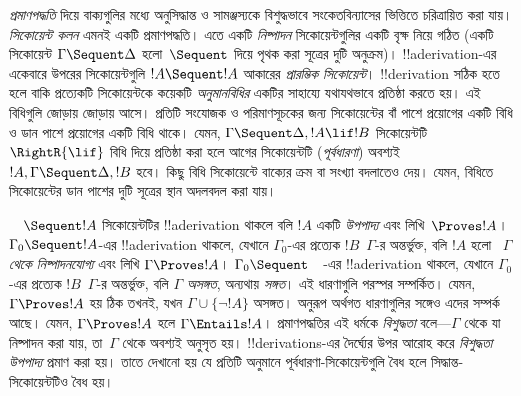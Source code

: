\emph{প্রমাণপদ্ধতি} দিয়ে বাক্যগুলির মধ্যে অনুসিদ্ধান্ত ও
সামঞ্জস্যকে বিশুদ্ধভাবে সংকেতবিন্যাসের ভিত্তিতে চরিত্রায়িত করা
যায়। \emph{সিকোয়েন্ট কলন} এমনই একটি প্রমাণপদ্ধতি। এতে একটি
\emph{নিষ্পাদন} সিকোয়েন্টগুলির একটি বৃক্ষ নিয়ে গঠিত (একটি
সিকোয়েন্ট $\Gamma \Sequent \Delta$ হলো~$\Sequent$ দিয়ে পৃথক
করা সূত্রের দুটি অনুক্রম)। !!a{derivation}-এর একেবারে উপরের
সিকোয়েন্টগুলি $!A \Sequent !A$ আকারের \emph{প্রারম্ভিক সিকোয়েন্ট}।
!!{derivation} সঠিক হতে হলে বাকি প্রত্যেকটি সিকোয়েন্টকে কয়েকটি
\emph{অনুমানবিধির} একটির সাহায্যে যথাযথভাবে প্রতিষ্ঠা করতে হয়।
এই বিধিগুলি জোড়ায় জোড়ায় আসে। প্রতিটি সংযোজক ও পরিমাণসূচকের
জন্য সিকোয়েন্টের বাঁ পাশে প্রয়োগের একটি বিধি ও ডান পাশে
প্রয়োগের একটি বিধি থাকে। যেমন, $\Gamma \Sequent \Delta, !A \lif !B$
সিকোয়েন্টটি $\RightR{\lif}$ বিধি দিয়ে প্রতিষ্ঠা করা হলে
আগের সিকোয়েন্টটি (\emph{পূর্বধারণা}) অবশ্যই
$!A, \Gamma \Sequent \Delta, !B$ হবে। কিছু বিধি সিকোয়েন্টে
বাক্যের ক্রম বা সংখ্যা বদলাতেও দেয়। যেমন, \RightR{\Exchange}
বিধিতে সিকোয়েন্টের ডান পাশের দুটি সূত্রের স্থান অদলবদল করা যায়।

$\quad \Sequent !A$ সিকোয়েন্টটির !!a{derivation} থাকলে
বলি $!A$ একটি \emph{উপপাদ্য} এবং লিখি~$\Proves !A$।
$\Gamma_0 \Sequent !A$-এর !!a{derivation} থাকলে, যেখানে
$\Gamma_0$-এর প্রত্যেক $!B$~$\Gamma$-র অন্তর্ভুক্ত, বলি $!A$ হলো
~$\Gamma$ \emph{থেকে নিষ্পাদনযোগ্য} এবং লিখি $\Gamma \Proves !A$।
$\Gamma_0 \Sequent \quad$-এর !!a{derivation} থাকলে, যেখানে
$\Gamma_0$-এর প্রত্যেক $!B$~$\Gamma$-র অন্তর্ভুক্ত, বলি $\Gamma$
\emph{অসঙ্গত}, অন্যথায় \emph{সঙ্গত}। এই ধারণাগুলি পরস্পর
সম্পর্কিত। যেমন, $\Gamma \Proves !A$ হয় ঠিক তখনই, যখন
$\Gamma \cup \{\lnot !A\}$ অসঙ্গত। অনুরূপ অর্থগত ধারণাগুলির সঙ্গেও
এদের সম্পর্ক আছে। যেমন, $\Gamma \Proves !A$ হলে $\Gamma \Entails !A$।
প্রমাণপদ্ধতির এই ধর্মকে \emph{বিশুদ্ধতা} বলে—$\Gamma$ থেকে যা
নিষ্পাদন করা যায়, তা~$\Gamma$ থেকে অবশ্যই অনুসৃত হয়।
!!{derivation}s-এর দৈর্ঘ্যের উপর আরোহ করে \emph{বিশুদ্ধতা
উপপাদ্য} প্রমাণ করা হয়। তাতে দেখানো হয় যে প্রতিটি অনুমানে
পূর্বধারণা-সিকোয়েন্টগুলি বৈধ হলে সিদ্ধান্ত-সিকোয়েন্টটিও বৈধ হয়।
